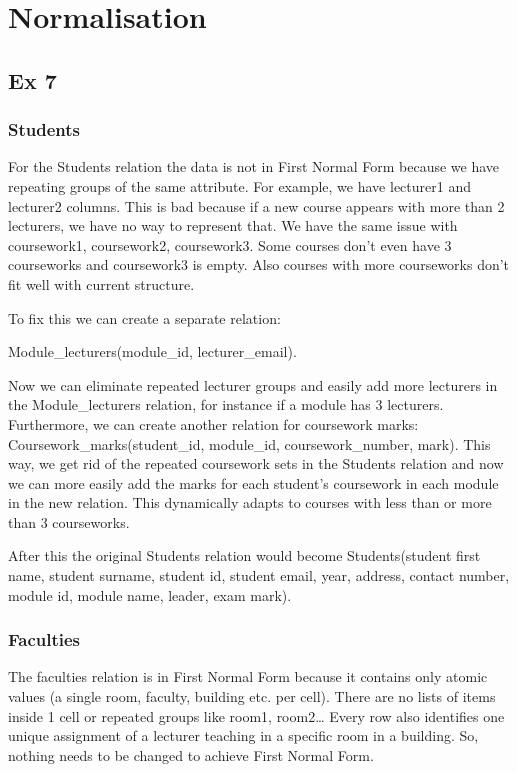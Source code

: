 \section{Normalisation}

\subsection*{Ex 7}

\subsubsection*{Students}
For the Students relation the data is not in First Normal Form because we have repeating groups of the same attribute. 
For example, we have lecturer1 and lecturer2 columns. This is bad because if a new course appears with more than 2 lecturers, we have no way to represent that. We have the same issue with coursework1, coursework2, coursework3. Some courses don’t even have 3 courseworks and coursework3 is empty. Also courses with more courseworks don’t fit well with current structure.

To fix this we can create a separate relation: 

Module_lecturers(module_id, lecturer_email). 

Now we can eliminate repeated lecturer groups and easily add more lecturers in the Module_lecturers relation, for instance if a module has 3 lecturers. Furthermore, we can create another relation for coursework marks: Coursework_marks(student_id, module_id, coursework_number, mark). This way, we get rid of the repeated coursework sets in the Students relation and now we can more easily add the marks for each student’s coursework in each module in the new relation. This dynamically adapts to courses with less than or more than 3 courseworks.

After this the original Students relation would become Students(student first name, student surname, student id, student email, year, address, contact number, module id, module name, leader, exam mark). 

\subsubsection*{Faculties}
The faculties relation is in First Normal Form because it contains only atomic values (a single room, faculty, building etc. per cell). There are no lists of items inside 1 cell or repeated groups like room1, room2… Every row also identifies one unique assignment of a lecturer teaching in a specific room in a building. So, nothing needs to be changed to achieve First Normal Form.


